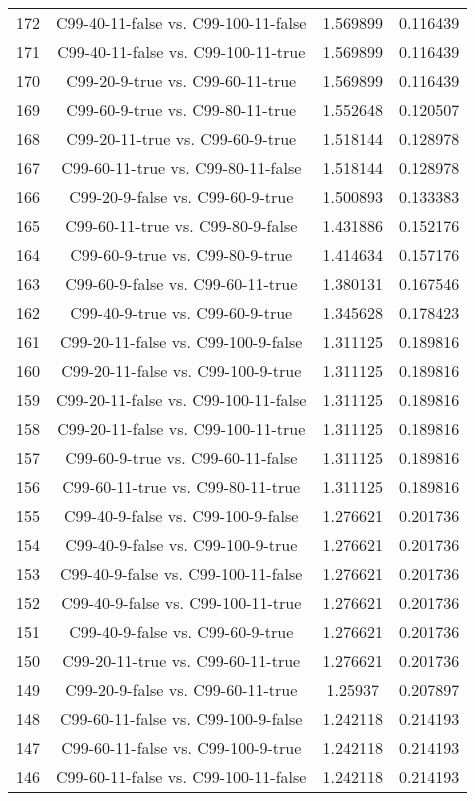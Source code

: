 \documentclass[a4paper,10pt]{article}
\begin{document}
\begin{landscape}
\begin{table}[!htp]
\begin{tabular}{cccc}
172&C99-40-11-false vs. C99-100-11-false&1.569899&0.116439\\
171&C99-40-11-false vs. C99-100-11-true&1.569899&0.116439\\
170&C99-20-9-true vs. C99-60-11-true&1.569899&0.116439\\
169&C99-60-9-true vs. C99-80-11-true&1.552648&0.120507\\
168&C99-20-11-true vs. C99-60-9-true&1.518144&0.128978\\
167&C99-60-11-true vs. C99-80-11-false&1.518144&0.128978\\
166&C99-20-9-false vs. C99-60-9-true&1.500893&0.133383\\
165&C99-60-11-true vs. C99-80-9-false&1.431886&0.152176\\
164&C99-60-9-true vs. C99-80-9-true&1.414634&0.157176\\
163&C99-60-9-false vs. C99-60-11-true&1.380131&0.167546\\
162&C99-40-9-true vs. C99-60-9-true&1.345628&0.178423\\
161&C99-20-11-false vs. C99-100-9-false&1.311125&0.189816\\
160&C99-20-11-false vs. C99-100-9-true&1.311125&0.189816\\
159&C99-20-11-false vs. C99-100-11-false&1.311125&0.189816\\
158&C99-20-11-false vs. C99-100-11-true&1.311125&0.189816\\
157&C99-60-9-true vs. C99-60-11-false&1.311125&0.189816\\
156&C99-60-11-true vs. C99-80-11-true&1.311125&0.189816\\
155&C99-40-9-false vs. C99-100-9-false&1.276621&0.201736\\
154&C99-40-9-false vs. C99-100-9-true&1.276621&0.201736\\
153&C99-40-9-false vs. C99-100-11-false&1.276621&0.201736\\
152&C99-40-9-false vs. C99-100-11-true&1.276621&0.201736\\
151&C99-40-9-false vs. C99-60-9-true&1.276621&0.201736\\
150&C99-20-11-true vs. C99-60-11-true&1.276621&0.201736\\
149&C99-20-9-false vs. C99-60-11-true&1.25937&0.207897\\
148&C99-60-11-false vs. C99-100-9-false&1.242118&0.214193\\
147&C99-60-11-false vs. C99-100-9-true&1.242118&0.214193\\
146&C99-60-11-false vs. C99-100-11-false&1.242118&0.214193\\

\end{tabular}
\end{table}
\end{landscape}
\end{document}
